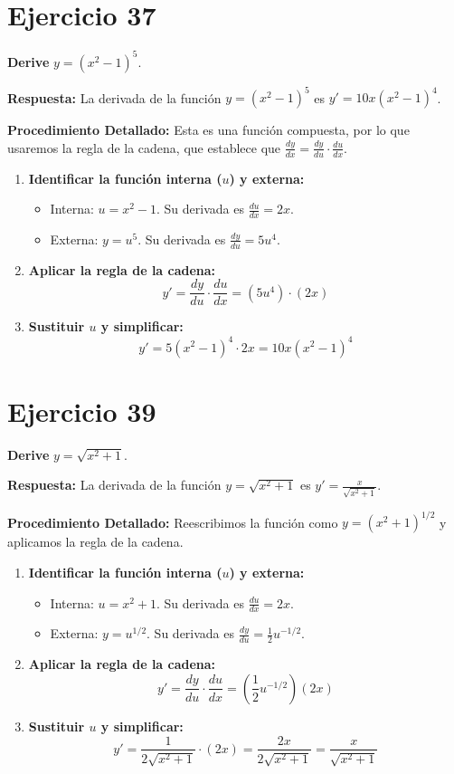 \documentclass[12pt, a4paper]{article}
\begin{document}
\section{Ejercicio 37}
\textbf{Derive} $y=(x^2-1)^5$.

\textbf{Respuesta:}
La derivada de la función $y=(x^2-1)^5$ es $y'=10x(x^2-1)^4$.

\textbf{Procedimiento Detallado:}
Esta es una función compuesta, por lo que usaremos la regla de la cadena, que establece que $\frac{dy}{dx}=\frac{dy}{du}\cdot\frac{du}{dx}$.
\begin{enumerate}
    \item \textbf{Identificar la función interna ($u$) y externa:}
    \begin{itemize}
        \item Interna: $u=x^2-1$. Su derivada es $\frac{du}{dx}=2x$.
        \item Externa: $y=u^5$. Su derivada es $\frac{dy}{du}=5u^4$.
    \end{itemize}
    \item \textbf{Aplicar la regla de la cadena:}
    \[y' = \frac{dy}{du}\cdot\frac{du}{dx} = (5u^4)\cdot(2x)\]
    \item \textbf{Sustituir $u$ y simplificar:}
    \[y' = 5(x^2-1)^4 \cdot 2x = 10x(x^2-1)^4\]
\end{enumerate}

\section{Ejercicio 39}
\textbf{Derive} $y=\sqrt{x^2+1}$.

\textbf{Respuesta:}
La derivada de la función $y=\sqrt{x^2+1}$ es $y'=\frac{x}{\sqrt{x^2+1}}$.

\textbf{Procedimiento Detallado:}
Reescribimos la función como $y=(x^2+1)^{1/2}$ y aplicamos la regla de la cadena.
\begin{enumerate}
    \item \textbf{Identificar la función interna ($u$) y externa:}
    \begin{itemize}
        \item Interna: $u=x^2+1$. Su derivada es $\frac{du}{dx}=2x$.
        \item Externa: $y=u^{1/2}$. Su derivada es $\frac{dy}{du}=\frac{1}{2}u^{-1/2}$.
    \end{itemize}
    \item \textbf{Aplicar la regla de la cadena:}
    \[y'=\frac{dy}{du}\cdot\frac{du}{dx}=\left(\frac{1}{2}u^{-1/2}\right)(2x)\]
    \item \textbf{Sustituir $u$ y simplificar:}
    \[y'=\frac{1}{2\sqrt{x^2+1}}\cdot(2x)=\frac{2x}{2\sqrt{x^2+1}}=\frac{x}{\sqrt{x^2+1}}\]
\end{enumerate}
\end{document}
